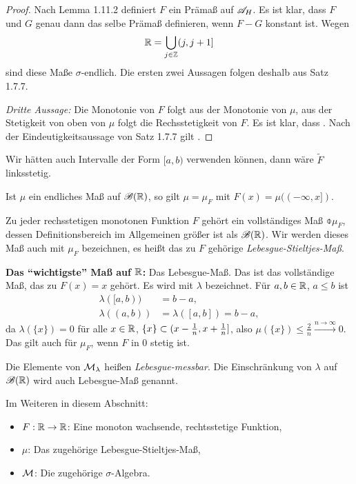 \begin{proof}
 Nach Lemma 1.11.2 definiert $F$ ein Prämaß auf $\mathscr{A}_H$. Es ist klar, dass $F$
 und $G$ genau dann das selbe Prämaß definieren, wenn $F-G$ konstant ist. Wegen
 \[ \mathbb{R} = \bigcup_{j \in \mathbb{Z}} (j, j+1] \]
 sind diese Maße $\sigma$-endlich. Die ersten zwei Aussagen folgen deshalb aus
 Satz 1.7.7.
 
 \emph{Dritte Aussage:} Die Monotonie von $F$ folgt aus der Monotonie von $\mu$,
 aus der Stetigkeit von oben von $\mu$ folgt die Rechsstetigkeit von $F$. Es ist
 klar, dass . Nach der Eindeutigkeitsaussage von
 Satz 1.7.7 gilt .
\end{proof}

\begin{rmrk}
 Wir hätten auch Intervalle der Form $[a,b)$ verwenden können, dann wäre
 $\tilde{F}$ linksstetig.
 
 Ist $\mu$ ein endliches Maß auf $\mathscr{B}(\mathbb{R})$, so gilt $\mu = \mu_F$ mit
 $F(x) = \mu((-\infty, x])$. 
 
 Zu jeder rechsstetigen monotonen Funktion $F$ gehört ein vollständiges Maß
 $\obar{\mu}_F$, dessen Definitionsbereich im Allgemeinen größer ist als
 $\mathscr{B}(\mathbb{R})$. Wir werden dieses Maß auch mit $\mu_F$ bezeichnen, es heißt
 das zu $F$ gehörige \emph{Lebesgue-Stieltjes-Maß}.
\end{rmrk}

\textbf{Das ``wichtigste'' Maß auf $\mathbb{R}$:} Das Lebesgue-Maß. Das ist das
vollständige Maß, das zu $F(x) = x$ gehört. Es wird mit $\lambda$ bezeichnet.
Für $a,b \in \mathbb{R}$, $a \le b$ ist 
\[ \begin{aligned}
    \lambda( [a,b) ) &= b - a, \\ 
    \lambda( (a,b) ) &= \lambda( [a,b] ) = b-a,
   \end{aligned} \]
da $\lambda(\{x\}) = 0$ für alle $x \in \mathbb{R}$, $\{ x \} \subset (x - \frac{1}{n}, x
+ \frac{1}{n}]$, also $\mu( \{ x \} ) \le \frac{2}{n} \xrightarrow{n \to \infty} 0$.
Das gilt auch für $\mu_F$, wenn $F$ in 0 stetig ist.

Die Elemente von $\mathcal{M}_\lambda$ heißen \emph{Lebesgue-messbar}. Die
Einschränkung von $\lambda$ auf $\mathscr{B}(\mathbb{R})$ wird auch Lebesgue-Maß genannt.

Im Weiteren in diesem Abschnitt:
\begin{itemize}
 \item $F: \mathbb{R} \to \mathbb{R}$: Eine monoton wachsende, rechtsstetige Funktion,
 \item $\mu$: Das zugehörige Lebesgue-Stieltjes-Maß,
 \item $\mathcal{M}$: Die zugehörige $\sigma$-Algebra.
\end{itemize}

